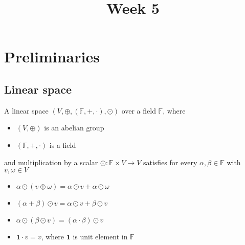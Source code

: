 \documentclass{article}
\title{Week 5}
\author{\aut}
\begin{document}
\maketitle

\section{Preliminaries}\label{vector space defs}

\subsection{Linear space}

\begin{definition}\rm\nextline
	A linear space $(V,\oplus,(\mathbb{F},+,\cdot),\odot)$ over a field $\mathbb{F}$, where
	\begin{itemize}
		\item $(V,\oplus)$ is an abelian group
		\item $(\mathbb{F},+,\cdot)$ is a field
	\end{itemize}
	and multiplication by a scalar $\odot:\mathbb{F}\times V\xrightarrow{}V$ satisfies for every $\alpha,\beta\in\mathbb{F}$ with $v,\omega\in V$
	\begin{itemize}
		\item $\alpha\odot(v\oplus\omega)=\alpha\odot v+\alpha\odot\omega$
		\item $(\alpha+\beta)\odot v=\alpha\odot v+\beta\odot v$
		\item $\alpha\odot(\beta\odot v)=(\alpha\cdot\beta)\odot v$
		\item $\mathbf{1}\cdot v=v$, where $\mathbf{1}$ is unit element in $\mathbb{F}$
	\end{itemize}
\end{definition}
\end{document}
